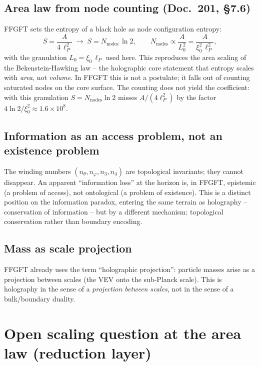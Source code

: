 \subsection*{Area law from node counting (Doc.~201, §7.6)}

FFGFT sets the entropy of a black hole as node configuration entropy:
\[
S = \frac{A}{4\,\ell_P^2} \;\longrightarrow\; S = N_{\text{nodes}}\,\ln 2,
\qquad N_{\text{nodes}} \propto \frac{A}{L_0^2} = \frac{A}{\xi_0^2\,\ell_P^2},
\]
with the granulation $L_0=\xi_0\,\ell_P$ used here. This reproduces the area
scaling of the Bekenstein-Hawking law -- the holographic core statement that entropy
scales with \emph{area}, not \emph{volume}. In FFGFT this is not a postulate;
it falls out of counting saturated nodes on the core surface. The counting does
not yield the coefficient: with this granulation $S=N_{\text{nodes}}\ln 2$
misses $A/(4\ell_P^2)$ by the factor $4\ln 2/\xi_0^2\approx1.6\times10^8$.

\subsection*{Information as an access problem, not an existence problem}

The winding numbers $(n_\theta, n_\varphi, n_3, n_4)$ are topological
invariants; they cannot disappear. An apparent \enquote{information loss} at
the horizon is, in FFGFT, epistemic (a problem of access), not ontological (a
problem of existence). This is a distinct position on the information
paradox, entering the same terrain as holography -- conservation of
information -- but by a different mechanism: topological conservation rather
than boundary encoding.

\subsection*{Mass as scale projection}

FFGFT already uses the term \enquote{holographic projection}: particle masses
arise as a projection between scales (the VEV onto the sub-Planck scale). This
is holography in the sense of a \emph{projection between scales}, not in the
sense of a bulk/boundary duality.

\section{Open scaling question at the area law (reduction layer)}
\label{sec:263-open}

